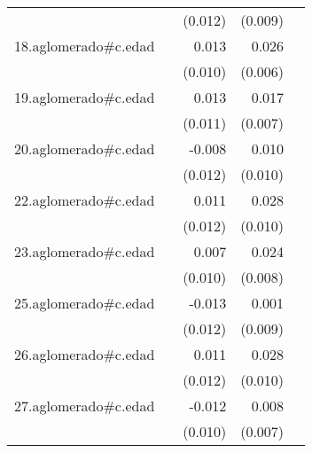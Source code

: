 {\begin{longtable}{l*{4}{D{.}{.}{-1}}}
            &                     &     (0.012)         &     (0.009)         &                     \\
\addlinespace
18.aglomerado#c.edad&                     &       0.013         &       0.026\sym{***}&                     \\
            &                     &     (0.010)         &     (0.006)         &                     \\
\addlinespace
19.aglomerado#c.edad&                     &       0.013         &       0.017\sym{*}  &                     \\
            &                     &     (0.011)         &     (0.007)         &                     \\
\addlinespace
20.aglomerado#c.edad&                     &      -0.008         &       0.010         &                     \\
            &                     &     (0.012)         &     (0.010)         &                     \\
\addlinespace
22.aglomerado#c.edad&                     &       0.011         &       0.028\sym{**} &                     \\
            &                     &     (0.012)         &     (0.010)         &                     \\
\addlinespace
23.aglomerado#c.edad&                     &       0.007         &       0.024\sym{**} &                     \\
            &                     &     (0.010)         &     (0.008)         &                     \\
\addlinespace
25.aglomerado#c.edad&                     &      -0.013         &       0.001         &                     \\
            &                     &     (0.012)         &     (0.009)         &                     \\
\addlinespace
26.aglomerado#c.edad&                     &       0.011         &       0.028\sym{**} &                     \\
            &                     &     (0.012)         &     (0.010)         &                     \\
\addlinespace
27.aglomerado#c.edad&                     &      -0.012         &       0.008         &                     \\
            &                     &     (0.010)         &     (0.007)         &                     \\

\end{longtable}}
